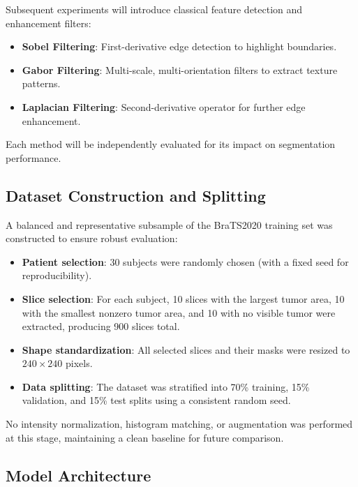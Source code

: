 Subsequent experiments will introduce classical feature detection and enhancement filters:
\begin{itemize}
    \item \textbf{Sobel Filtering}: First-derivative edge detection to highlight boundaries.
    \item \textbf{Gabor Filtering}: Multi-scale, multi-orientation filters to extract texture patterns.
    \item \textbf{Laplacian Filtering}: Second-derivative operator for further edge enhancement.
\end{itemize}
Each method will be independently evaluated for its impact on segmentation performance.

\subsection{Dataset Construction and Splitting}
\label{sec:dataset_split}

A balanced and representative subsample of the BraTS2020 training set was constructed to ensure robust evaluation:
\begin{itemize}
    \item \textbf{Patient selection}: 30 subjects were randomly chosen (with a fixed seed for reproducibility).
    \item \textbf{Slice selection}: For each subject, 10 slices with the largest tumor area, 10 with the smallest nonzero tumor area, and 10 with no visible tumor were extracted, producing 900 slices total.
    \item \textbf{Shape standardization}: All selected slices and their masks were resized to $240 \times 240$ pixels.
    \item \textbf{Data splitting}: The dataset was stratified into 70\% training, 15\% validation, and 15\% test splits using a consistent random seed.
\end{itemize}
No intensity normalization, histogram matching, or augmentation was performed at this stage, maintaining a clean baseline for future comparison.

\subsection{Model Architecture}
\label{sec:model_architecture}


